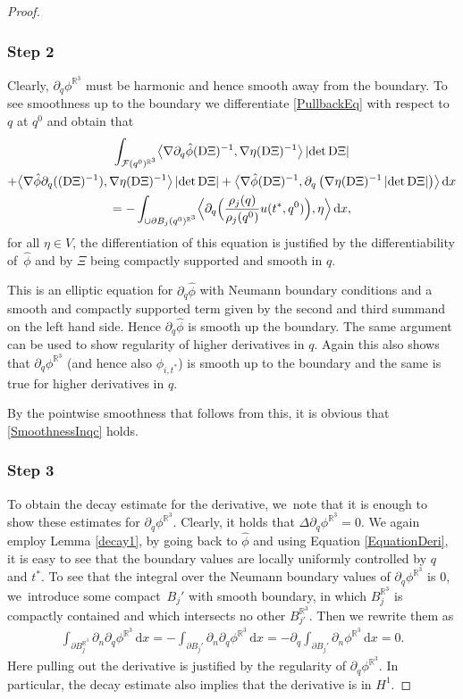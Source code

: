 \documentclass[JEP,XML,SOM,Unicode,published]{cedram}
\theoremstyle{definition}
\newcommand\R{\mathbb{R}}
\newcommand\bscalar[2]{\bigl\langle #1,#2\bigr\rangle}
\newcommand\Bscalar[2]{\Bigl\langle #1,#2\Bigr\rangle}
\newcommand\eq{=}
\newcommand\dd{\,\mathrm{d}}
\newcommand\dx{\dd x}
\let\de\partial
\begin{document}
\begin{proof}
\subsubsection*{Step 2} Clearly, $\de_q \phi^{\R^3}$ must be harmonic and hence smooth away from the boundary. To see smoothness up to the boundary we differentiate \eqref{PullbackEq} with respect to $q$ at $q^0$ and obtain that
\begin{multline}
\int_{\mathcal{F}(q^0)^{\R^3}}\bscalar{\nabla\de_q\hat{\phi}(\text{D}\Xi)^{-1}}{\nabla\eta(\text{D}\Xi)^{-1}}\,|{\det \mathrm{D}\Xi}|\\
+\bscalar{\nabla\hat{\phi}\de_q((\text{D}\Xi)^{-1})}{\nabla\eta(\text{D}\Xi)^{-1}}\,|{\det \text{D}\Xi}|
+ \bscalar{\nabla\hat{\phi}(\text{D}\Xi)^{-1}}{\de_q\left(\nabla\eta(\text{D}\Xi)^{-1}\,|{\det \text{D}\Xi}|\right)}\dx\label{EquationDeri}\\
\eq-\int_{\cup \de B_j(q^0)^{\R^3} }\Bscalar{\de_q\Bigl(\frac{\rho_j(q)}{\rho_j(q^0)}u(t^*,q^0)\Bigr)}{\eta}\dx,
\end{multline}
for all $\eta\in V$, the differentiation of this equation is justified by the differentiability of~$\hat{\phi}$ and by $\Xi$ being compactly supported and smooth in $q$.

This is an elliptic equation for $\de_q\hat{\phi}$ with Neumann boundary conditions and a smooth and compactly supported term given by the second and third summand on the left hand side. Hence $\de_q\hat{\phi}$ is smooth up the boundary. The same argument can be used to show regularity of higher derivatives in $q$. Again this also shows that $\de_q\phi^{\R^3}$ (and hence also $\phi_{i,t^*}$) is smooth up to the boundary and the same is true for higher derivatives in $q$.

By the pointwise smoothness that follows from this, it is obvious that \eqref{SmoothnessInqc} holds.

\subsubsection*{Step 3} To obtain the decay estimate for the derivative, we~note that it is enough to show these estimates for $\de_q\phi^{\R^3}$. Clearly, it holds that $\Delta\de_q\phi^{\R^3}=0$.
We again employ Lemma \ref{decay1}, by \eg going back to $\hat{\phi}$ and using Equation \eqref{EquationDeri}, it is easy to see that the boundary values are locally uniformly controlled by $q$ and $t^*$. To see that the integral over the Neumann boundary values of $\de_q\phi^{\R^3}$ is $0$, we~introduce some compact~$B_j'$ with smooth boundary, in which $B_j^{\R^3}$ is compactly contained and which intersects no other $B_{j'}^{\R^3}$. Then we rewrite them as
\begin{align*}
\int_{\de B_j^{\R^3}}\de_n\de_q\phi^{\R^3}\dx\eq -\int_{\de B_j'}\de_n\de_q\phi^{\R^3}\dx\eq-\de_q\int_{\de B_j'}\de_n\phi^{\R^3}\dx\eq0.
\end{align*}
Here pulling out the derivative is justified by the regularity of $\de_q\phi^{\R^3}$.
In particular, the decay estimate also implies that the derivative is in $H^1$.
\end{proof}
\end{document}
